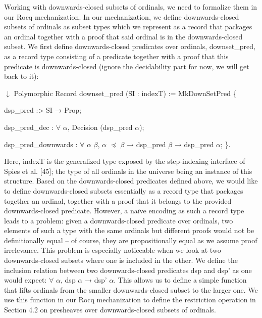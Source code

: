  
Working with downwards-closed subsets of ordinals, we need to formalize them in our Rocq mechanization. In our mechanization, we define downwards-closed subsets of ordinals as subset types which we represent as a record that packages an ordinal together with a proof that said ordinal is in the downwards-closed subset. We first define downwards-closed predicates over ordinals, downset\_pred, as a record type consisting of a predicate together with a proof that this predicate is downwards-closed (ignore the decidability part for now, we will get back to it):\par
  \ensuremath{\downarrow} 
 Polymorphic Record downset\_pred (SI : indexT) := MkDownSetPred \{ 
 
  dsp\_pred :> SI → Prop; 
 
  dsp\_pred\_dec : \ensuremath{\forall} \ensuremath{\alpha}, Decision (dsp\_pred \ensuremath{\alpha}); 
 
  dsp\_pred\_downwards : \ensuremath{\forall} \ensuremath{\alpha} \ensuremath{\beta}, \ensuremath{\alpha} \ensuremath{\preceq} \ensuremath{\beta} → dsp\_pred \ensuremath{\beta} → dsp\_pred \ensuremath{\alpha}; \}. 
  
Here, indexT is the generalized type exposed by the step-indexing interface of Spies et al. [45]; the type of all ordinals in the universe being an instance of this structure. Based on the downwards-closed predicates defined above, we would like to define downwards-closed subsets essentially as a record type that packages together an ordinal, together with a proof that it belongs to the provided downwards-closed predicate. However, a naïve encoding as such a record type leads to a problem: given a downwards-closed predicate over ordinals, two elements of such a type with the same ordinals but different proofs would not be definitionally equal – of course, they are propositionally equal as we assume proof irrelevance. This problem is especially noticeable when we look at two downwards-closed subsets where one is included in the other. We define the inclusion relation between two downwards-closed predicates dsp and dsp’ as one would expect: \ensuremath{\forall} \ensuremath{\alpha}, dsp \ensuremath{\alpha} → dsp’ \ensuremath{\alpha}. This allows us to define a simple function that lifts ordinals from the smaller downwards-closed subset to the larger one. We use this function in our Rocq mechanization to define the restriction operation in Section 4.2 on presheaves over downwards-closed subsets of ordinals.\par
 

